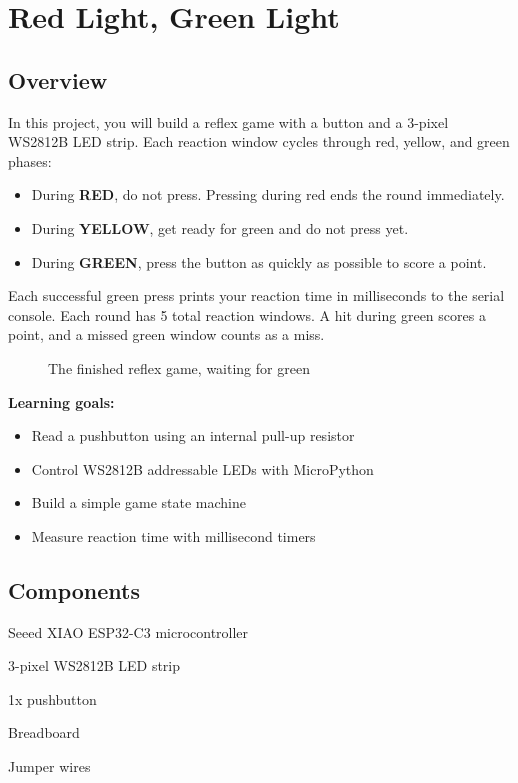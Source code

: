 \chapter{Red Light, Green Light}

\section{Overview}
In this project, you will build a reflex game with a button and a 3-pixel WS2812B LED strip.
Each reaction window cycles through red, yellow, and green phases:
\begin{itemize}
    \item During \textbf{RED}, do not press. Pressing during red ends the round immediately.
    \item During \textbf{YELLOW}, get ready for green and do not press yet.
    \item During \textbf{GREEN}, press the button as quickly as possible to score a point.
\end{itemize}

Each successful green press prints your reaction time in milliseconds to the serial console.
Each round has 5 total reaction windows. A hit during green scores a point, and a missed green
window counts as a miss.

\begin{figure}[H]
\centering
    \caption{The finished reflex game, waiting for green}
\end{figure}

\begin{tcolorbox}[colback=blue!5!white,colframe=blue!40!black]
    \textbf{Learning goals:}
    \begin{itemize}
        \item Read a pushbutton using an internal pull-up resistor
        \item Control WS2812B addressable LEDs with MicroPython
        \item Build a simple game state machine
        \item Measure reaction time with millisecond timers
    \end{itemize}
\end{tcolorbox}

\pagebreak

\section{Components}
\begin{components}
    \item Seeed XIAO ESP32-C3 microcontroller
    \item 3-pixel WS2812B LED strip
    \item 1x pushbutton
    \item Breadboard
    \item Jumper wires
\end{components}

